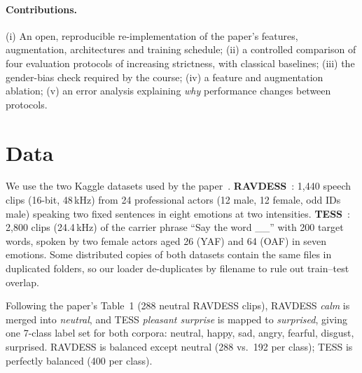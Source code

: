 \paragraph{Contributions.} (i) An open, reproducible re-implementation of the paper's features, augmentation,
architectures and training schedule; (ii) a controlled comparison of four evaluation protocols of increasing
strictness, with classical baselines; (iii) the gender-bias check required by the course; (iv) a feature and
augmentation ablation; (v) an error analysis explaining \emph{why} performance changes between protocols.

\section{Data}
We use the two Kaggle datasets used by the paper~\cite{kaggleravdess,kaggletess}.
\textbf{RAVDESS}~\cite{livingstone2018}: 1,440 speech clips (16-bit, 48\,kHz) from 24 professional actors
(12 male, 12 female, odd IDs male) speaking two fixed sentences in eight emotions at two intensities.
\textbf{TESS}~\cite{tess2020}: 2,800 clips (24.4\,kHz) of the carrier phrase ``Say the word \_\_'' with 200 target
words, spoken by two female actors aged 26 (YAF) and 64 (OAF) in seven emotions. Some distributed copies of both
datasets contain the same files in duplicated folders, so our loader de-duplicates by filename to rule out
train--test overlap.

Following the paper's Table~1 (288 neutral RAVDESS clips), RAVDESS \emph{calm} is merged into \emph{neutral}, and TESS
\emph{pleasant surprise} is mapped to \emph{surprised}, giving one 7-class label set for both corpora:
neutral, happy, sad, angry, fearful, disgust, surprised. RAVDESS is balanced except neutral (288 vs.\ 192 per class);
TESS is perfectly balanced (400 per class).

